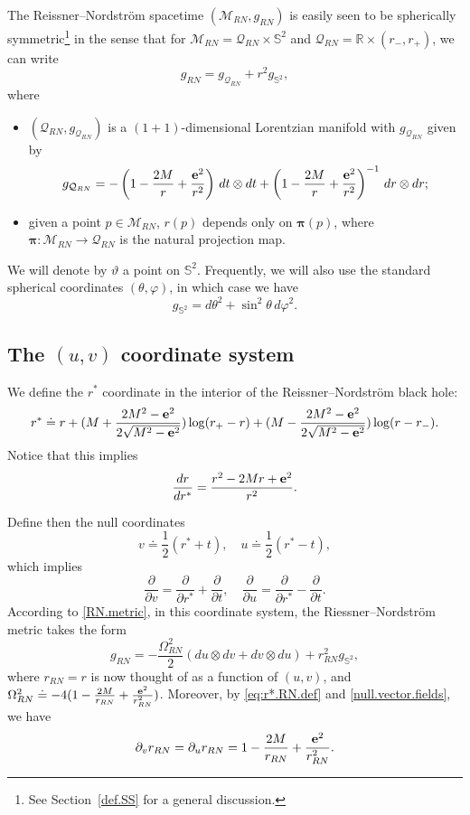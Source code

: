 \documentclass[10pt, reqno]{amsart}
\theoremstyle{definition}
\theoremstyle{remark}
\numberwithin{equation}{section}
\newcommand{\rd}{\partial}
\newcommand{\0}{\emptyset}
\newcommand{\tht}{\theta}
\newcommand{\Omg}{\Omega}
\newcommand{\f}{\frac}
\begin{document}
The Reissner--Nordstr\"om spacetime $(\mathcal M_{RN},g_{RN})$ is easily seen to be spherically symmetric\footnote{See Section~\ref{def.SS} for a general discussion.} in the sense that for $\mathcal M_{RN} = \mathcal Q_{RN} \times \mathbb S^2$ and $\mathcal Q_{RN}=\mathbb R\times (r_-,r_+)$, we can write
$$g_{RN} = g_{\mathcal Q_{RN}} + r^2 g_{\mathbb S^2},$$
where 
\begin{itemize}
\item $(\mathcal Q_{RN},g_{\mathcal Q_{RN}})$ is a $(1+1)$-dimensional Lorentzian manifold with $g_{\mathcal Q_{RN}}$ given by 
$$g_{\mathcal Q_{RN}} = -\left(1-\f {2M} r+\f{{\bf e}^2}{r^2}\right)\,dt\otimes dt + \left(1-\f {2M} r+\f{{\bf e}^2}{r^2}\right)^{-1}\, dr\otimes dr;$$
\item given a point $p\in \mathcal M_{RN}$, $r(p)$ depends only on ${\boldsymbol \pi}(p)$, where ${\boldsymbol \pi}:\mathcal M_{RN}\to \mathcal Q_{RN}$ is the natural projection map.
\end{itemize}
We will denote by $\vartheta$ a point on $\mathbb S^2$. Frequently, we will also use the standard spherical coordinates $(\theta,\varphi)$, in which case we have
$$g_{\mathbb S^2} = d\tht^2 + \sin^2\tht \, d\varphi^2.$$


\subsection{The $(u,v)$ coordinate system}\label{sec.null.1}



We define the $r^*$ coordinate in the interior of the Reissner--Nordstr\"om black hole:
\begin{equation}\label{eq:r*.RN.def}
r^* \doteq r+(M+\frac{2M^2-{\bf e}^2}{2\sqrt{M^2-{\bf e}^2}})\log (r_+-r) +(M-\frac{2M^2-{\bf e}^2}{2\sqrt{M^2-{\bf e}^2}})\log (r-r_-).
\end{equation}
Notice that this implies
$$\f{dr}{dr^*} = \f{r^2-2Mr+{\bf e}^2}{r^2}.$$

Define then the null coordinates
\begin{equation}\label{eq:uv.RN.def}
v \doteq \frac 12(r^*+t),\quad u \doteq \frac 12(r^*-t),
\end{equation}
which implies
\begin{equation}\label{null.vector.fields}
\frac{\rd}{\rd v}= \frac{\rd}{\rd r^*}+\frac{\rd}{\rd t},\quad\frac{\rd}{\rd u}= \frac{\rd}{\rd r^*}-\frac{\rd}{\rd t}.
\end{equation}
According to \eqref{RN.metric}, in this coordinate system, the Riessner--Nordstr\"{o}m metric takes the form
$$g_{RN}=-\f{\Omg_{RN}^2}{2} (du\otimes dv+dv\otimes du)+ r_{RN}^2 g_{\mathbb S^2},$$
where $r_{RN} = r$ is now thought of as a function of $(u,v)$, and $\Omg_{RN}^2 \doteq -4(1-\frac{2M}{r_{RN}}+\frac{{\bf e}^2}{r_{RN}^2})$. Moreover, by \eqref{eq:r*.RN.def} and \eqref{null.vector.fields}, we have
\begin{equation}\label{int.r}
\rd_v r_{RN} = \rd_u r_{RN} = 1-\f{2M}{r_{RN}}+\f{{\bf e}^2}{r_{RN}^2}.
\end{equation}
\end{document}

